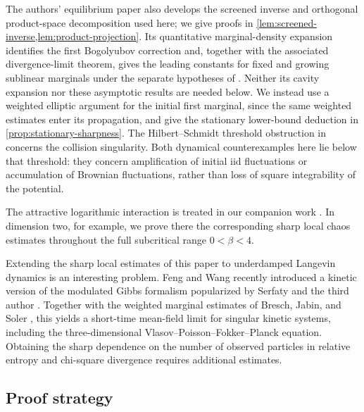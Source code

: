 \documentclass[11pt,reqno]{amsart}
\numberwithin{equation}{section}
\theoremstyle{plain}
\theoremstyle{remark}
\begin{document}
\begingroup
The authors' equilibrium paper \cite[Lemma~5.2 and Lemma~6.1]{DGRchaos} also develops the screened inverse and orthogonal product-space decomposition used here; we give proofs in \cref{lem:screened-inverse,lem:product-projection}. Its quantitative marginal-density expansion identifies the first Bogolyubov correction and, together with the associated divergence-limit theorem, gives the leading constants for fixed and growing sublinear marginals under the separate hypotheses of \cite[Theorems~2.3 and~2.4]{DGRchaos}. Neither its cavity expansion nor these asymptotic results are needed below. We instead use a weighted elliptic argument for the initial first marginal, since the same weighted estimates enter its propagation, and give the stationary lower-bound deduction in \cref{prop:stationary-sharpness}. The Hilbert--Schmidt threshold obstruction in \cite[Theorem~2.5]{DGRchaos} concerns the collision singularity. Both dynamical counterexamples here lie below that threshold: they concern amplification of initial iid fluctuations or accumulation of Brownian fluctuations, rather than loss of square integrability of the potential.
\par\endgroup



\begingroup
The attractive logarithmic interaction is treated in our companion work \cite{DGRAttractiveII}. In dimension two, for example, we prove there the corresponding sharp local chaos estimates throughout the full subcritical range $0<\beta<4$.
\par\endgroup



\begin{remark}\label{rem:intro-kinetic}
Extending the sharp local estimates of this paper to underdamped Langevin dynamics is an interesting problem. {Feng and Wang \cite{FW26} recently introduced a kinetic version of the modulated Gibbs formalism popularized by Serfaty and the third author \cite{RSlsi}.} Together with the weighted marginal estimates of Bresch, Jabin, and Soler \cite{BJS}, this yields a short-time mean-field limit for singular kinetic systems, including the three-dimensional Vlasov--Poisson--Fokker--Planck equation. Obtaining the sharp dependence on the number of observed particles in relative entropy and chi-square divergence requires additional estimates.
\end{remark}


\subsection{Proof strategy}\label{sec:proof-strategy}
\end{document}
